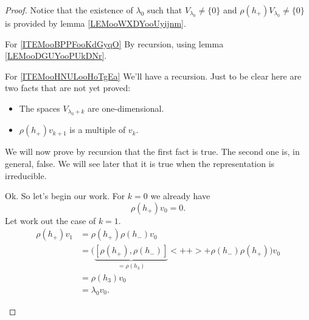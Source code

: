 \begin{proof}
    Notice that the existence of \( \lambda_0\) such that \( V_{\lambda_0}\neq \{ 0 \}\) and \( \rho(h_+)V_{\lambda_0}\neq\{ 0 \}\) is provided by lemma \ref{LEMooWXDYooUyijnm}.
    \begin{subproof}
    \item[For \ref{ITEMooBPPFooKdGyqO}]
        By recursion, using lemma \ref{LEMooDGUYooPUkDNr}.
    \item[For \ref{ITEMooHNULooHoTgEa}]
        We'll have a recursion. Just to be clear here are two facts that are not yet proved:
        \begin{itemize}
            \item The spaces \( V_{\lambda_0+k}\) are one-dimensional.
            \item \( \rho(h_+)v_{k+1}\) is a multiple of \( v_k\).
        \end{itemize}
        We will now prove by recursion that the first fact is true. The second one is, in general, false. We will see later that it is true when the representation is irreducible.

        Ok. So let's begin our work. For \( k=0\) we already have
        \begin{equation}
            \rho(h_+)v_0=0.
        \end{equation}
        Let work out the case of \( k=1\).
        \begin{subequations}
            \begin{align}
                \rho(h_+)v_1&=\rho(h_+)\rho(h_-)v_0\\
                &=\big( \underbrace{[\rho(h_+),\rho(h_-)]}_{=\rho(h_3)}<++>+\rho(h_-)\rho(h_+) \big)v_0\\
                &=\rho(h_3)v_0\\
                &=\lambda_0v_0.
            \end{align}
        \end{subequations}
        

\end{subproof}
\end{proof}
